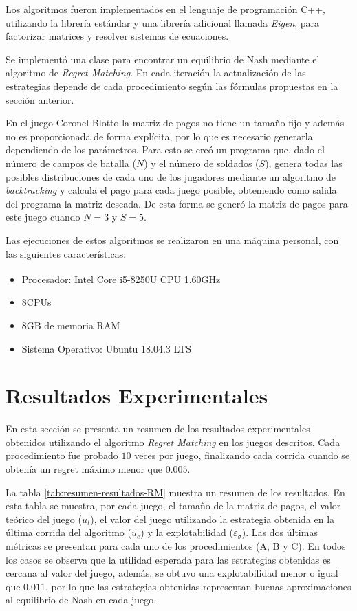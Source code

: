 Los algoritmos fueron implementados en el lenguaje de programación C++, utilizando la librería estándar y una librería adicional llamada \textit{Eigen}, para factorizar matrices y resolver sistemas de ecuaciones.

Se implementó una clase para encontrar un equilibrio de Nash mediante el algoritmo de \textit{Regret Matching}. En cada iteración la actualización de las estrategias depende de cada procedimiento según las fórmulas propuestas en la sección anterior.

En el juego Coronel Blotto la matriz de pagos no tiene un tamaño fijo y además no es proporcionada de forma explícita, por lo que es necesario generarla dependiendo de los parámetros. Para esto se creó un programa que, dado el número de campos de batalla ($N$) y el número de soldados ($S$), genera todas las posibles distribuciones de cada uno de los jugadores mediante un algoritmo de \textit{backtracking} y calcula el pago para cada juego posible, obteniendo como salida del programa la matriz deseada. De esta forma se generó la matriz de pagos para este juego cuando $N = 3$ y $S = 5$.

Las ejecuciones de estos algoritmos se realizaron en una máquina personal, con las siguientes características:
\begin{itemize}[noitemsep]
    \item Procesador: Intel\textsuperscript{\textregistered} Core\textsuperscript{\texttrademark} i5-8250U CPU   1.60GHz
    \item 8CPUs
    \item 8GB de memoria RAM
    \item Sistema Operativo: Ubuntu 18.04.3 LTS
\end{itemize}


\section{Resultados Experimentales}

En esta sección se presenta un resumen de los resultados experimentales obtenidos utilizando el algoritmo \textit{Regret Matching} en los juegos descritos. Cada procedimiento fue probado $10$ veces por juego, finalizando cada corrida cuando se obtenía un regret máximo menor que $0.005$.

La tabla \ref{tab:resumen-resultados-RM} muestra un resumen de los resultados. En esta tabla se muestra, por cada juego, el tamaño de la matriz de pagos, el valor teórico del juego ($u_t$), el valor del juego utilizando la estrategia obtenida en la última corrida del algoritmo ($u_e$) y la explotabilidad ($\varepsilon_{\sigma}$). Las dos últimas métricas se presentan para cada uno de los procedimientos (A, B y C). En todos los casos se observa que la utilidad esperada para las estrategias obtenidas es cercana al valor del juego, además, se obtuvo una explotabilidad menor o igual que $0.011$, por lo que las estrategias obtenidas representan buenas aproximaciones al equilibrio de Nash en cada juego.

